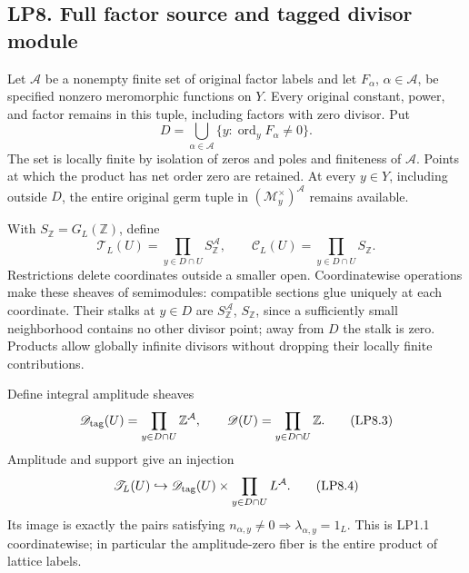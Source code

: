 \subsection{LP8. Full factor source and tagged divisor
module}\label{lp8.-full-factor-source-and-tagged-divisor-module}

Let \(\mathcal A\) be a nonempty finite set of original factor labels
and let \(F_\alpha\), \(\alpha\in\mathcal A\), be specified nonzero
meromorphic functions on \(Y\). Every original constant, power, and
factor remains in this tuple, including factors with zero divisor. Put
\[
D=\bigcup_{\alpha\in\mathcal A}
\{y:\operatorname{ord}_yF_\alpha\ne0\}.
\tag{LP8.1}
\] The set is locally finite by isolation of zeros and poles and
finiteness of \(\mathcal A\). Points at which the product has net order
zero are retained. At every \(y\in Y\), including outside \(D\), the
entire original germ tuple in \((\mathcal M_y^\times)^{\mathcal A}\)
remains available.

With \(S_{\mathbb Z}=G_L(\mathbb Z)\), define \[
\mathscr T_L(U)=\prod_{y\in D\cap U}S_{\mathbb Z}^{\mathcal A},\qquad
\mathscr C_L(U)=\prod_{y\in D\cap U}S_{\mathbb Z}.
\tag{LP8.2}
\] Restrictions delete coordinates outside a smaller open.
Coordinatewise operations make these sheaves of semimodules: compatible
sections glue uniquely at each coordinate. Their stalks at \(y\in D\)
are \(S_{\mathbb Z}^{\mathcal A}\), \(S_{\mathbb Z}\), since a
sufficiently small neighborhood contains no other divisor point; away
from \(D\) the stalk is zero. Products allow globally infinite divisors
without dropping their locally finite contributions.

Define integral amplitude sheaves \[
\mathscr D_{\rm tag}(U)=\prod_{y\in D\cap U}\mathbb Z^{\mathcal A},\qquad
\mathscr D(U)=\prod_{y\in D\cap U}\mathbb Z.
\tag{LP8.3}
\] Amplitude and support give an injection \[
\mathscr T_L(U)\hookrightarrow
\mathscr D_{\rm tag}(U)\times\prod_{y\in D\cap U}L^{\mathcal A}.
\tag{LP8.4}
\] Its image is exactly the pairs satisfying
\(n_{\alpha,y}\ne0\Rightarrow\lambda_{\alpha,y}=1_L\). This is LP1.1
coordinatewise; in particular the amplitude-zero fiber is the entire
product of lattice labels.

